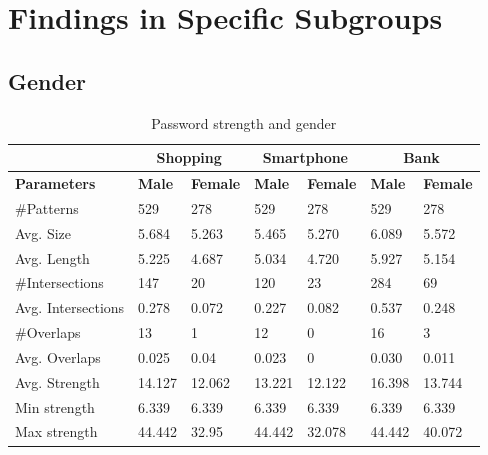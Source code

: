 \section{Findings in Specific Subgroups}

	\subsection{Gender}

		\begin{table}[H]
      \centering
      \begin{tabular}{l || l | l || l | l || l | l }
        \hline
         & \multicolumn{2}{c||}{\bf Shopping} & \multicolumn{2}{c||}{\bf Smartphone} &\multicolumn{2}{c}{\bf Bank} \\ \hline
        {\bf Parameters}   & {\bf Male} & {\bf Female} & {\bf Male} & {\bf Female} & {\bf Male} & {\bf Female}\\ \hline
        \#Patterns         & 529    & 278    & 529    & 278    & 529    & 278  	 \\
        Avg. Size          & 5.684  & 5.263  & 5.465  & 5.270  & 6.089  & 5.572  \\
        Avg. Length        & 5.225  & 4.687  & 5.034  & 4.720  & 5.927  & 5.154  \\
        \#Intersections    & 147 		& 20     & 120    & 23     & 284    & 69     \\
        Avg. Intersections & 0.278  & 0.072  & 0.227  & 0.082  & 0.537  & 0.248  \\
        \#Overlaps         & 13     & 1      & 12     & 0      & 16     & 3  		 \\
        Avg. Overlaps      & 0.025  & 0.04   & 0.023  & 0      & 0.030  & 0.011  \\ \hline
        Avg. Strength      & 14.127 & 12.062 & 13.221 & 12.122 & 16.398 & 13.744 \\ 
        Min strength       & 6.339  & 6.339  & 6.339  & 6.339  & 6.339  & 6.339  \\
        Max strength       & 44.442 & 32.95  & 44.442 & 32.078 & 44.442 & 40.072 \\ \hline
      \end{tabular}
      \caption{Password strength and gender }
      \label{tab:gendertrength}
    \end{table}

